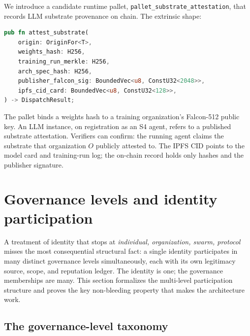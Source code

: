 \documentclass[11pt,a4paper,parskip=half-,DIV=12,headings=standardclasses]{scrartcl}
\theoremstyle{ncthm}
\theoremstyle{ncdef}
\begin{document}
We introduce a candidate runtime pallet,
\texttt{pallet\_substrate\_attestation}, that records LLM substrate
provenance on chain. The extrinsic shape:

\begin{lstlisting}[language=rust]
pub fn attest_substrate(
    origin: OriginFor<T>,
    weights_hash: H256,
    training_run_merkle: H256,
    arch_spec_hash: H256,
    publisher_falcon_sig: BoundedVec<u8, ConstU32<2048>>,
    ipfs_cid_card: BoundedVec<u8, ConstU32<128>>,
) -> DispatchResult;
\end{lstlisting}

The pallet binds a weights hash to a training organization's
Falcon-512 public key. An LLM instance, on registration as an S4
agent, refers to a published substrate attestation. Verifiers can
confirm: the running agent claims the substrate that organization $O$
publicly attested to. The IPFS CID points to the model card and
training-run log; the on-chain record holds only hashes and the
publisher signature.

\section{Governance levels and identity participation}\label{sec:governance}

A treatment of identity that stops at \emph{individual, organization,
swarm, protocol} misses the most consequential structural fact: a
single identity participates in many distinct governance levels
simultaneously, each with its own legitimacy source, scope, and
reputation ledger. The identity is one; the governance memberships
are many. This section formalizes the multi-level participation
structure and proves the key non-bleeding property that makes the
architecture work.

\subsection{The governance-level taxonomy}
\end{document}
